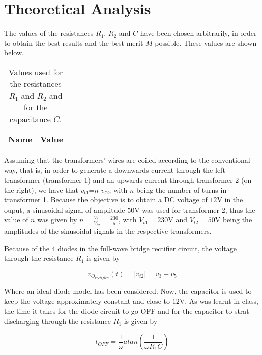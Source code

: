 \section{Theoretical Analysis}

The values of the resistances $R_1$, $R_2$ and $C$ have been chosen arbitrarily, in order to obtain the best results and the best merit $M$ possible. These values are shown below.

\begin{table}[H]
  \centering
  \begin{tabular}{|c|c|}
    \hline    
    {\bf Name} & {\bf Value} \\ \hline
    
  \end{tabular}
  \caption{Values used for the resistances $R_1$ and $R_2$ and for the capacitance $C$.}
  \label{tab:ChosenValues}
\end{table}

Assuming that the transformers' wires are coiled according to the conventional way, that is, in order to generate a downwards current through the left transformer (transformer 1) and an upwards current through transformer 2 (on the right), we have that $v_{t1}$=$n$ $v_{t2}$, with $n$ being the number of turns in transformer 1. Because the objective is to obtain a DC voltage of $12$V in the ouput, a sinusoidal signal of amplitude $50$V was used for transformer 2, thus the value of $n$ was given by $n=\frac{V_{t1}}{V_{t2}}=\frac{230}{5}$, with $V_{t1}=230$V and $V_{t2}=50$V being the amplitudes of the sinusoidal signals in the respective transformers.
\par
Because of the 4 diodes in the full-wave bridge rectifier circuit, the voltage through the resistance $R_1$ is given by

\begin{equation} \label{eq:rectified_voltage}
  v_{O_{rectified}}(t)=|v_{t2}|=v_3-v_5
\end{equation}

Where an ideal diode model has been considered. Now, the capacitor is used to keep the voltage approximately constant and close to $12$V. As was learnt in class, the time it takes for the diode circuit to go OFF and for the capacitor to strat discharging through the resistance $R_1$ is given by

\begin{equation} \label{eq:rectified_voltage}
  t_{OFF}=\frac{1}{\omega}atan\left(\frac{1}{\omega R_1C}\right)
\end{equation}

